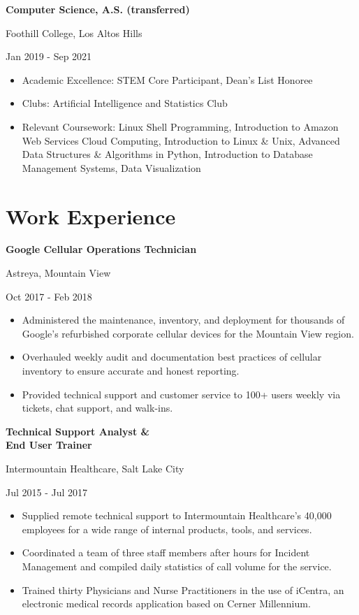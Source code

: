 \documentclass[10pt]{article}
\newcommand{\triline}[3]{%
    \parbox[t][][t]{.4\linewidth}{ #1 }%
    \parbox[t][][t]{.4\linewidth}{ #2 }%
    \parbox[t][][t]{.2\linewidth}{\raggedleft #3 }%
    \vspace{1ex}
}
\newlength{\listpostvertical}
\begin{document}
\triline{\textbf{Computer Science, A.S. (transferred)}}{Foothill College, Los Altos Hills}{Jan 2019 - Sep 2021}

\begin{itemize}[nosep]
\item Academic Excellence: STEM Core Participant, Dean’s List Honoree
\item Clubs: Artificial Intelligence and Statistics Club
\item Relevant Coursework: Linux Shell Programming, Introduction to 
    Amazon Web Services Cloud Computing, Introduction to Linux \& Unix, 
    Advanced Data Structures \& Algorithms in Python, Introduction to Database Management Systems, Data Visualization
\end{itemize}


\section{Work Experience}

\triline{\textbf{Google Cellular Operations Technician}}{Astreya, Mountain View}{Oct 2017 - Feb 2018}
\begin{itemize}[nosep]
\item Administered the maintenance, inventory, and deployment for thousands of Google’s refurbished corporate cellular devices for the Mountain View region. 
\item Overhauled weekly audit and documentation best practices of cellular inventory to ensure accurate and honest reporting. 
\item Provided technical support and customer service to 100+ users weekly via tickets, chat support, and walk-ins.

\end{itemize}
\vspace{\listpostvertical}

\triline{\textbf{Technical Support Analyst \& \\ End User Trainer}}{Intermountain Healthcare, Salt Lake City}{Jul 2015 - Jul 2017}
\vspace{\listpostvertical}

\begin{itemize}[nosep]
\item Supplied remote technical support to Intermountain Healthcare’s 
    40,000 employees for a wide range of internal products, tools, and services.
\item Coordinated a team of three staff members after hours for Incident Management
     and compiled daily statistics of call volume for the service.
\item Trained thirty Physicians and Nurse Practitioners in the use of iCentra, 
    an electronic medical records application based on Cerner Millennium.
\end{itemize}
\end{document}
